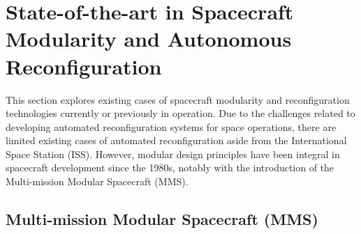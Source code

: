 \section{State-of-the-art in Spacecraft Modularity and Autonomous Reconfiguration}
This section explores existing cases of spacecraft modularity and reconfiguration technologies currently or previously in operation. Due to the challenges related to developing automated reconfiguration systems for space operations, there are limited existing cases of automated reconfiguration aside from the International Space Station (ISS). However, modular design principles have been integral in spacecraft development since the 1980s, notably with the introduction of the Multi-mission Modular Spacecraft (MMS).

\subsection{Multi-mission Modular Spacecraft (MMS)}


